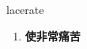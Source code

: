 
\begin{frame}
{\huge lacerate}
\begin{center}
\begin{enumerate}\Large
  \item \textbf{使非常痛苦}
\end{enumerate}
\end{center}
\end{frame}
